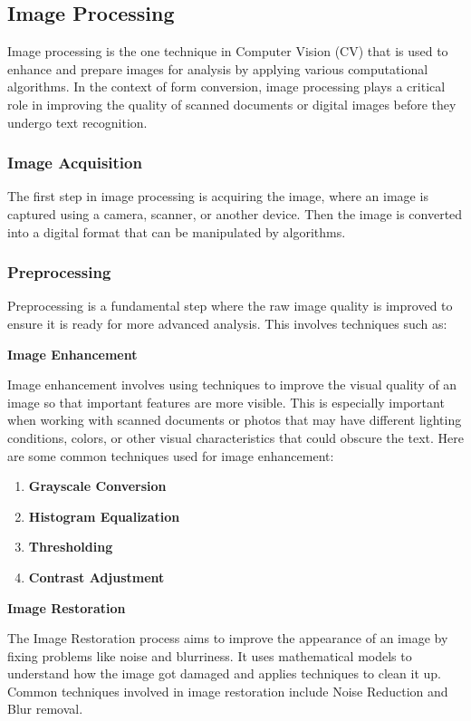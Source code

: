 \documentclass[12pt,oneside,openright,a4paper]{cpe-english-project}
\begin{document}
\subsection{Image Processing}

Image processing is the one technique in Computer Vision (CV) that is used to enhance and prepare images for analysis by applying various computational algorithms. In the context of form conversion, image processing plays a critical role in improving the quality of scanned documents or digital images before they undergo text recognition.

\subsubsection{Image Acquisition} 
The first step in image processing is acquiring the image, where an image is captured using a camera, scanner, or another device. Then the image is converted into a digital format that can be manipulated by algorithms.

\subsubsection{Preprocessing} 
Preprocessing is a fundamental step where the raw image quality is improved to ensure it is ready for more advanced analysis. This involves techniques such as:

\textbf{Image Enhancement}

Image enhancement involves using techniques to improve the visual quality of an image so that important features are more visible. This is especially important when working with scanned documents or photos that may have different lighting conditions, colors, or other visual characteristics that could obscure the text. Here are some common techniques used for image enhancement:

\begin{enumerate}
	\item \textbf{Grayscale Conversion}
	\item \textbf{Histogram Equalization}
	\item \textbf{Thresholding}
	\item \textbf{Contrast Adjustment}
\end{enumerate}

\textbf{Image Restoration}

The Image Restoration process aims to improve the appearance of an image by fixing problems like noise and blurriness. It uses mathematical models to understand how the image got damaged and applies techniques to clean it up. Common techniques involved in image restoration include Noise Reduction and Blur removal.
\end{document}

